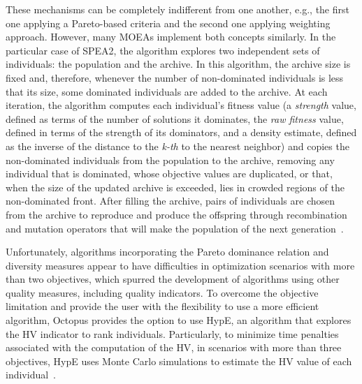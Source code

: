 	These mechanisms can be completely indifferent from one another, e.g., the first one applying a Pareto-based criteria and the second one applying weighting approach. However, many \acp{MOEA} implement both concepts similarly. In the particular case of \ac{SPEA}2, the algorithm explores two independent sets of individuals: the population and the archive. In this algorithm, the archive size is fixed and, therefore, whenever the number of non-dominated individuals is less that its size, some dominated individuals are added to the archive. At each iteration, the algorithm computes each individual's fitness value (a \textit{strength} value, defined as terms of the number of solutions it dominates, the \textit{raw fitness} value, defined in terms of the strength of its dominators, and a density estimate, defined as the inverse of the distance to the \textit{k-th} to the nearest neighbor) and copies the non-dominated individuals from the population to the archive, removing any individual that is dominated, whose objective values are duplicated, or that, when the size of the updated archive is exceeded, lies in crowded regions of the non-dominated front. After filling the archive, pairs of individuals are chosen from the archive to reproduce and produce the offspring through recombination and mutation operators that will make the population of the next generation~\cite{Zitzler2001SPEA2}.
	
	Unfortunately, algorithms incorporating the Pareto dominance relation and diversity measures appear to have difficulties in optimization scenarios with more than two objectives, which spurred the development of algorithms using other quality measures, including quality indicators. To overcome the objective limitation and provide the user with the flexibility to use a more efficient algorithm, Octopus provides the option to use \ac{HypE}, an algorithm that explores the \ac{HV} indicator to rank individuals. Particularly, to minimize time penalties associated with the computation of the \ac{HV}, in scenarios with more than three objectives, \ac{HypE} uses Monte Carlo simulations to estimate the \ac{HV} value of each individual~\cite{Zitzler2011HypE}. 

	
